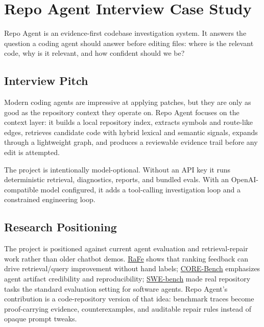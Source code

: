 \documentclass[UTF8,12pt,openany]{ctexbook}
\begin{document}
\clearpage
\chapter{Repo Agent Interview Case Study}

Repo Agent is an evidence-first codebase investigation system. It answers the question a coding agent should answer before editing files: where is the relevant code, why is it relevant, and how confident should we be?\par

\section{Interview Pitch}

Modern coding agents are impressive at applying patches, but they are only as good as the repository context they operate on. Repo Agent focuses on the context layer: it builds a local repository index, extracts symbols and route-like edges, retrieves candidate code with hybrid lexical and semantic signals, expands through a lightweight graph, and produces a reviewable evidence trail before any edit is attempted.\par

The project is intentionally model-optional. Without an API key it runs deterministic retrieval, diagnostics, reports, and bundled evals. With an OpenAI-compatible model configured, it adds a tool-calling investigation loop and a constrained engineering loop.\par

\section{Research Positioning}

The project is positioned against current agent evaluation and retrieval-repair work rather than older chatbot demos. \href{https://arxiv.org/html/2405.14431v1}{RaFe} shows that ranking feedback can drive retrieval/query improvement without hand labels; \href{https://arxiv.org/abs/2409.11363}{CORE-Bench} emphasizes agent artifact credibility and reproducibility; \href{https://arxiv.org/abs/2310.06770}{SWE-bench} made real repository tasks the standard evaluation setting for software agents. Repo Agent's contribution is a code-repository version of that idea: benchmark traces become proof-carrying evidence, counterexamples, and auditable repair rules instead of opaque prompt tweaks.\par
\end{document}
